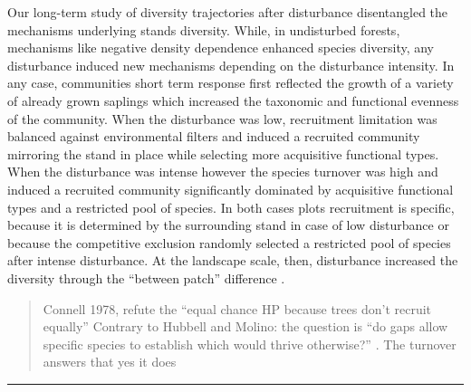\documentclass[fleqn,10pt]{ArtEcoFoG} %
\begin{document}
Our long-term study of diversity trajectories after disturbance
disentangled the mechanisms underlying stands diversity. While, in
undisturbed forests, mechanisms like negative density dependence
enhanced species diversity, any disturbance induced new mechanisms
depending on the disturbance intensity. In any case, communities short
term response first reflected the growth of a variety of already grown
saplings which increased the taxonomic and functional evenness of the
community. When the disturbance was low, recruitment limitation was
balanced against environmental filters and induced a recruited community
mirroring the stand in place while selecting more acquisitive functional
types. When the disturbance was intense however the species turnover was
high and induced a recruited community significantly dominated by
acquisitive functional types and a restricted pool of species. In both
cases plots recruitment is specific, because it is determined by the
surrounding stand in case of low disturbance or because the competitive
exclusion randomly selected a restricted pool of species after intense
disturbance. At the landscape scale, then, disturbance increased the
diversity through the ``between patch'' difference
\citep{Denslow1987, Chesson2000, Sheil2003, Guitet2017}.

\begin{quote}
Connell 1978, refute the ``equal chance HP because trees don't recruit
equally'' Contrary to Hubbell and Molino: the question is ``do gaps
allow specific species to establish which would thrive otherwise?''
\citep{Sheil2003}. The turnover answers that yes it does
\end{quote}

\begin{center}\rule{0.5\linewidth}{\linethickness}\end{center}





\end{document}
